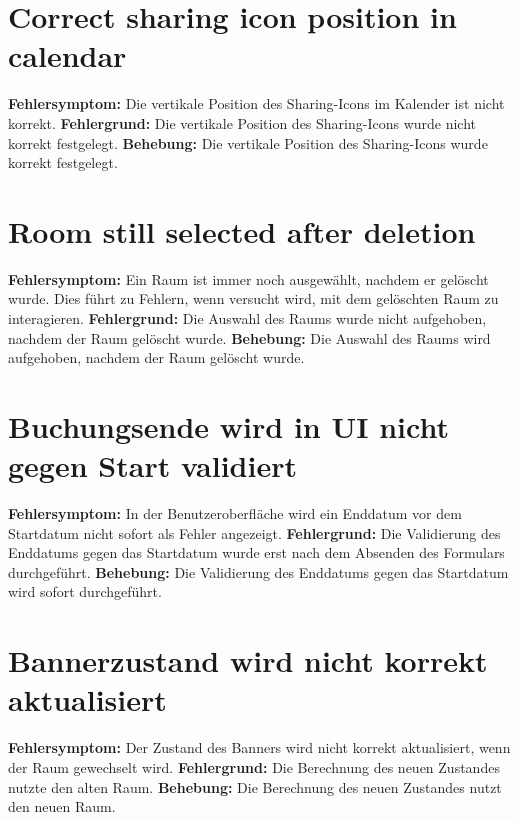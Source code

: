 \section{Correct sharing icon position in calendar}
\textbf{Fehlersymptom:} Die vertikale Position des Sharing-Icons im Kalender ist nicht korrekt.
\textbf{Fehlergrund:} Die vertikale Position des Sharing-Icons wurde nicht korrekt festgelegt.
\textbf{Behebung:} Die vertikale Position des Sharing-Icons wurde korrekt festgelegt.

\section{Room still selected after deletion}
\textbf{Fehlersymptom:} Ein Raum ist immer noch ausgewählt, nachdem er gelöscht wurde. Dies führt zu Fehlern, wenn versucht wird, mit dem gelöschten Raum zu interagieren.
\textbf{Fehlergrund:} Die Auswahl des Raums wurde nicht aufgehoben, nachdem der Raum gelöscht wurde.
\textbf{Behebung:} Die Auswahl des Raums wird aufgehoben, nachdem der Raum gelöscht wurde.

\section{Buchungsende wird in UI nicht gegen Start validiert}
\textbf{Fehlersymptom:} In der Benutzeroberfläche wird ein Enddatum vor dem Startdatum nicht sofort als Fehler angezeigt.
\textbf{Fehlergrund:} Die Validierung des Enddatums gegen das Startdatum wurde erst nach dem Absenden des Formulars durchgeführt.
\textbf{Behebung:} Die Validierung des Enddatums gegen das Startdatum wird sofort durchgeführt.

\section{Bannerzustand wird nicht korrekt aktualisiert}
\textbf{Fehlersymptom:} Der Zustand des Banners wird nicht korrekt aktualisiert, wenn der Raum gewechselt wird.
\textbf{Fehlergrund:} Die Berechnung des neuen Zustandes nutzte den alten Raum.
\textbf{Behebung:} Die Berechnung des neuen Zustandes nutzt den neuen Raum.

